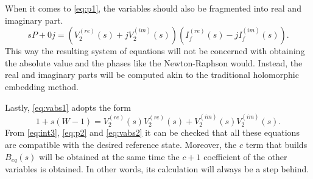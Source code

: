 \documentclass[conference]{IEEEtran}
\begin{document}
When it comes to \eqref{eq:p1}, the variables should also be fragmented into real and imaginary part. 
\begin{equation}
  sP+0j=(V^{(re)}_2(s) + jV^{(im)}_2(s))(I^{(re)}_f(s) - jI^{(im)}_f(s)).
  \label{eq:p2}
\end{equation}
This way the resulting system of equations will not be concerned with obtaining the absolute value and the phases like the Newton-Raphson would. Instead, the real and imaginary parts will be computed akin to the traditional holomorphic embedding method. 

Lastly, \eqref{eq:vabs1} adopts the form
\begin{equation}
  1 + s(W - 1) = V^{(re)}_2(s)V^{(re)}_2(s) + V^{(im)}_2(s)V^{(im)}_2(s).
  \label{eq:vabs2}
\end{equation}
From \eqref{eq:int3}, \eqref{eq:p2} and \eqref{eq:vabs2} it can be checked that all these equations are compatible with the desired reference state. Moreover, the $c$ term that builds $B_{eq}(s)$ will be obtained at the same time the $c+1$ coefficient of the other variables is obtained. In other words, its calculation will always be a step behind.
\end{document}
